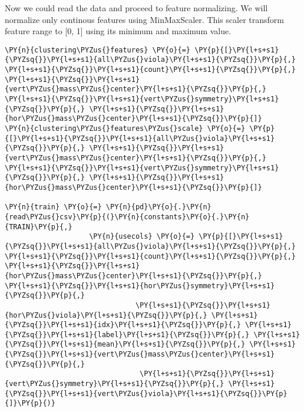     Now we could read the data and proceed to feature normalizing. We will
normalize only continous features using MinMaxScaler. This scaler
transform feature range to {[}0, 1{]} using its minimum and maximum
value.

    \begin{tcolorbox}[breakable, size=fbox, boxrule=1pt, pad at break*=1mm,colback=cellbackground, colframe=cellborder]
\begin{Verbatim}[commandchars=\\\{\}]
\PY{n}{clustering\PYZus{}features} \PY{o}{=} \PY{p}{[}\PY{l+s+s1}{\PYZsq{}}\PY{l+s+s1}{all\PYZus{}viola}\PY{l+s+s1}{\PYZsq{}}\PY{p}{,} \PY{l+s+s1}{\PYZsq{}}\PY{l+s+s1}{count}\PY{l+s+s1}{\PYZsq{}}\PY{p}{,} \PY{l+s+s1}{\PYZsq{}}\PY{l+s+s1}{vert\PYZus{}mass\PYZus{}center}\PY{l+s+s1}{\PYZsq{}}\PY{p}{,} \PY{l+s+s1}{\PYZsq{}}\PY{l+s+s1}{vert\PYZus{}symmetry}\PY{l+s+s1}{\PYZsq{}}\PY{p}{,} \PY{l+s+s1}{\PYZsq{}}\PY{l+s+s1}{hor\PYZus{}mass\PYZus{}center}\PY{l+s+s1}{\PYZsq{}}\PY{p}{]}
\PY{n}{clustering\PYZus{}features\PYZus{}scale} \PY{o}{=} \PY{p}{[}\PY{l+s+s1}{\PYZsq{}}\PY{l+s+s1}{all\PYZus{}viola}\PY{l+s+s1}{\PYZsq{}}\PY{p}{,} \PY{l+s+s1}{\PYZsq{}}\PY{l+s+s1}{vert\PYZus{}mass\PYZus{}center}\PY{l+s+s1}{\PYZsq{}}\PY{p}{,} \PY{l+s+s1}{\PYZsq{}}\PY{l+s+s1}{vert\PYZus{}symmetry}\PY{l+s+s1}{\PYZsq{}}\PY{p}{,} \PY{l+s+s1}{\PYZsq{}}\PY{l+s+s1}{hor\PYZus{}mass\PYZus{}center}\PY{l+s+s1}{\PYZsq{}}\PY{p}{]}

\PY{n}{train} \PY{o}{=} \PY{n}{pd}\PY{o}{.}\PY{n}{read\PYZus{}csv}\PY{p}{(}\PY{n}{constants}\PY{o}{.}\PY{n}{TRAIN}\PY{p}{,} 
                    \PY{n}{usecols} \PY{o}{=} \PY{p}{[}\PY{l+s+s1}{\PYZsq{}}\PY{l+s+s1}{all\PYZus{}viola}\PY{l+s+s1}{\PYZsq{}}\PY{p}{,} \PY{l+s+s1}{\PYZsq{}}\PY{l+s+s1}{count}\PY{l+s+s1}{\PYZsq{}}\PY{p}{,} \PY{l+s+s1}{\PYZsq{}}\PY{l+s+s1}{hor\PYZus{}mass\PYZus{}center}\PY{l+s+s1}{\PYZsq{}}\PY{p}{,} \PY{l+s+s1}{\PYZsq{}}\PY{l+s+s1}{hor\PYZus{}symmetry}\PY{l+s+s1}{\PYZsq{}}\PY{p}{,}
                               \PY{l+s+s1}{\PYZsq{}}\PY{l+s+s1}{hor\PYZus{}viola}\PY{l+s+s1}{\PYZsq{}}\PY{p}{,} \PY{l+s+s1}{\PYZsq{}}\PY{l+s+s1}{idx}\PY{l+s+s1}{\PYZsq{}}\PY{p}{,} \PY{l+s+s1}{\PYZsq{}}\PY{l+s+s1}{label}\PY{l+s+s1}{\PYZsq{}}\PY{p}{,} \PY{l+s+s1}{\PYZsq{}}\PY{l+s+s1}{mean}\PY{l+s+s1}{\PYZsq{}}\PY{p}{,} \PY{l+s+s1}{\PYZsq{}}\PY{l+s+s1}{vert\PYZus{}mass\PYZus{}center}\PY{l+s+s1}{\PYZsq{}}\PY{p}{,}
                                \PY{l+s+s1}{\PYZsq{}}\PY{l+s+s1}{vert\PYZus{}symmetry}\PY{l+s+s1}{\PYZsq{}}\PY{p}{,} \PY{l+s+s1}{\PYZsq{}}\PY{l+s+s1}{vert\PYZus{}viola}\PY{l+s+s1}{\PYZsq{}}\PY{p}{]}\PY{p}{)}


\end{Verbatim}
\end{tcolorbox}
